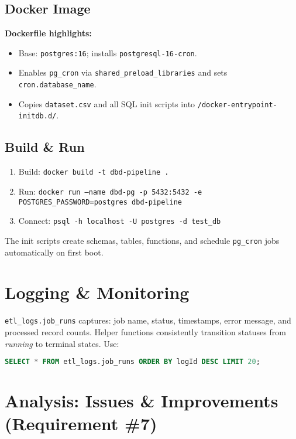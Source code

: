 \documentclass[11pt]{article}
\begin{document}
\subsection*{Docker Image}
\textbf{Dockerfile highlights:}
\begin{itemize}[leftmargin=1.2em]
  \item Base: \texttt{postgres:16}; installs \texttt{postgresql-16-cron}.
  \item Enables \texttt{pg\_cron} via \texttt{shared\_preload\_libraries} and sets \texttt{cron.database\_name}.
  \item Copies \texttt{dataset.csv} and all SQL init scripts into \texttt{/docker-entrypoint-initdb.d/}.
\end{itemize}

\subsection*{Build \& Run}
\begin{enumerate}[leftmargin=1.5em]
  \item Build: \texttt{docker build -t dbd-pipeline .}
  \item Run: \texttt{docker run --name dbd-pg -p 5432:5432 -e POSTGRES\_PASSWORD=postgres dbd-pipeline}
  \item Connect: \texttt{psql -h localhost -U postgres -d test\_db}
\end{enumerate}
The init scripts create schemas, tables, functions, and schedule \texttt{pg\_cron} jobs automatically on first boot.

\section{Logging \& Monitoring}
\texttt{etl\_logs.job\_runs} captures: job name, status, timestamps, error message, and processed record counts. Helper functions consistently transition statuses from \emph{running} to terminal states. Use:
\begin{lstlisting}[language=SQL]
SELECT * FROM etl_logs.job_runs ORDER BY logId DESC LIMIT 20;
\end{lstlisting}

\section{Analysis: Issues \& Improvements (Requirement \#7)}
\end{document}
